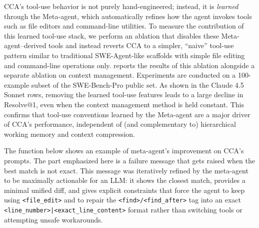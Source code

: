 CCA’s tool-use behavior is not purely hand-engineered; instead, it is \emph{learned} through the Meta-agent, which automatically refines how the agent invokes tools such as file editors and command-line utilities. 
To measure the contribution of this learned tool-use stack, we perform an ablation that disables these Meta-agent–derived tools and instead reverts CCA to a simpler,    ``naive'' tool-use pattern similar to traditional SWE-Agent-like scaffolds with simple file editing and command-line operations only.
 reports the results of this ablation alongside a separate ablation on context management. Experiments are conducted on a 100-example subset of the SWE-Bench-Pro public set. As shown in the Claude 4.5 Sonnet rows, removing the learned tool-use features leads to a large decline in Resolve@1, even when the context management method is held constant. This confirms that tool-use conventions learned by the Meta-agent are a major driver of CCA’s performance, independent of (and complementary to) hierarchical working memory and context compression.

The function below shows an example of meta-agent's improvement on CCA's prompts. The part emphasized here is a {failure message} that gets raised when the best match is not exact. This message was iteratively refined by the meta-agent to be maximally actionable for an LLM: it shows the closest match, provides a minimal unified diff, and gives explicit constraints that force the agent to keep using \texttt{<file\_edit>} and to repair the \texttt{<find>/<find\_after>} tag into an exact \texttt{<line\_number>|<exact\_line\_content>} format rather than switching tools or attempting unsafe workarounds.

